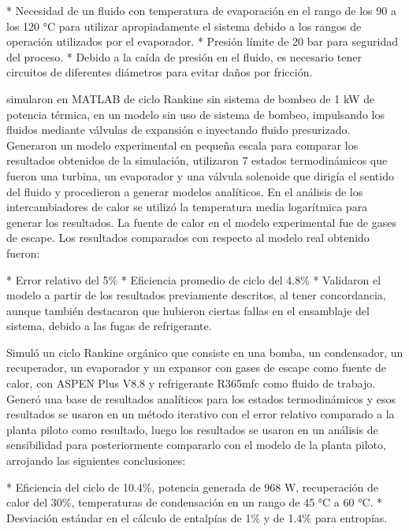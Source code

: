 \begin{markdown}
* Necesidad de un fluido con temperatura de evaporación en el rango de los 90 a los 120 °C para utilizar apropiadamente el sistema debido a los rangos de operación utilizados por el evaporador.
* Presión límite de 20 bar para seguridad del proceso.
* Debido a la caída de presión en el fluido, es necesario tener circuitos de diferentes diámetros para evitar daños por fricción.
\end{markdown}


\textcite{GKIMISIS2020115523} simularon en MATLAB de ciclo Rankine sin sistema de bombeo de 1 kW de potencia térmica, en un modelo sin uso de sistema de bombeo, impulsando los fluidos mediante válvulas de expansión e inyectando fluido presurizado. Generaron un modelo experimental en pequeña escala para comparar los resultados obtenidos de la simulación, utilizaron 7 estados termodinámicos que fueron una turbina, un evaporador y una válvula solenoide que dirigía el sentido del fluido y procedieron a generar modelos analíticos. En el análisis de los intercambiadores de calor se utilizó la temperatura media logarítmica para generar los resultados. La fuente de calor en el modelo experimental fue de gases de escape. Los resultados comparados con respecto al modelo real obtenido fueron:

\begin{markdown}
* Error relativo del 5\%
* Eficiencia promedio de ciclo del 4.8\%
* Validaron el modelo a partir de los resultados previamente descritos, al tener concordancia, aunque también destacaron que hubieron ciertas fallas en el ensamblaje del sistema, debido a las fugas de refrigerante.
\end{markdown}

\textcite{KUBOTH201718} Simuló un ciclo Rankine orgánico que consiste en una bomba, un condensador, un recuperador, un evaporador y un expansor con gases de escape como fuente de calor, con ASPEN Plus V8.8 y refrigerante R365mfc como fluido de trabajo. Generó una base de resultados analíticos para los estados termodinámicos y esos resultados se usaron en un método iterativo con el error relativo comparado a la planta piloto como resultado, luego los resultados se usaron en un análisis de sensibilidad para posteriormente compararlo con el modelo de la planta piloto, arrojando las siguientes conclusiones:

\begin{markdown}
* Eficiencia del ciclo de 10.4\%, potencia generada de 968 W, recuperación de calor del 30\%, temperaturas de condensación en un rango de 45 °C a 60 °C.
* Desviación estándar en el cálculo de entalpías de 1\% y de 1.4\% para entropías.
\end{markdown}

